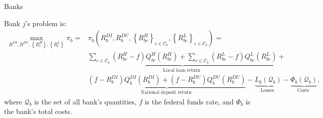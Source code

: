 \documentclass[notes,10pt, aspectratio=169]{beamer}
\newenvironment{wideitemize}{\itemize\addtolength{\itemsep}{10pt}}{\enditemize}
\begin{document}
\begin{frame}{Banks}

    \begin{wideitemize}
    \item Bank $j$'s problem is: 
    $$
    \begin{aligned}
        \max _{R^{D I}, R^{D U},\left\{R_c^H\right\},\left\{R_c^L\right\}} \pi_b= & \pi_b\left(R_b^{D I}, R_b^{D U},\left\{R_{b c}^H\right\}_{c \in \mathcal{C}_b},\left\{R_{b c}^L\right\}_{c \in \mathcal{C}_b}\right)= \\
        & \underbrace{\sum_{c \in \mathcal{C}_b}\left(R_{b c}^H-f\right) Q_{b c}^H\left(R_{b c}^H\right)+\sum_{c \in \mathcal{C}_b}\left(R_{b c}^L-f\right) Q_{b c}^L\left(R_{b c}^L\right)}_{\text {Local loan return }} +\\
        & \underbrace{\left(f-R_b^{D I}\right) Q_b^{D I}\left(R_b^{D I}\right)+\left(f-R_b^{D U}\right) Q_b^{D U}\left(R_b^{D U}\right)}_{\text {National deposit return }}-\underbrace{L_b\left(\mathcal{Q}_b\right)}_{\text {Losses }}-\underbrace{\Phi_b\left(\mathcal{Q}_b\right)}_{\text {Costs }},
        \end{aligned}
    $$
where $\mathcal{Q}_b$ is the set of all bank's quantities, $f$ is the federal funds rate, and $\Phi_b$ is the bank's total costs.


        \end{wideitemize}
    
    \end{frame}
\end{document}
